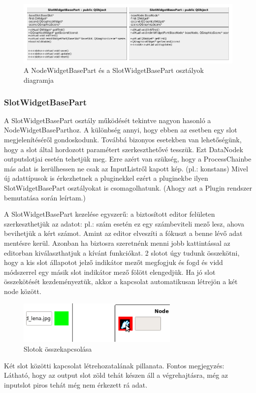 \documentclass[a4paper,12pt,oneside]{report}
\begin{document}
\begin{center}
\begin{figure}[h]
  \includegraphics[width=1.1\textwidth]{node_slot_widgetpart.png}
  \caption{A NodeWidgetBasePart és a SlotWidgetBasePart osztályok diagramja}

  \label{fig:bimg_widget_slot_view_diag}
\end{figure}
\end{center}

\subsubsection{SlotWidgetBasePart}
A SlotWidgetBasePart osztály működését tekintve nagyon hasonló a NodeWidgetBaseParthoz. A különbség annyi, hogy ebben az esetben egy slot megjelenítéséről gondoskodunk. Továbbá bizonyos esetekben van lehetőségünk, hogy a slot által hordozott paramétert szerkeszthetővé tesszük. Ezt DataNodek outputslotjai esetén tehetjük meg. Erre azért van szükség, hogy a ProcessChainbe más adat is kerülhessen ne csak az InputListről kapott kép. (pl.: konstans) Mivel új adattípusok is érkezhetnek a pluginekkel ezért a pluginekbe ilyen SlotWidgetBasePart osztályokat is csomagolhatunk. (Ahogy azt a Plugin rendszer bemutatása során leírtam.)

A SlotWidgetBasePart kezelése egyszerű: a biztosított editor felületen szerkeszthetjük az adatot: pl.: szám esetén ez egy számbeviteli mező lesz, ahova bevihetjük a kért számot. Amint az editor elveszíti a fókuszt a benne lévő adat mentésre kerül. Azonban ha biztosra szeretnénk menni jobb kattintással az editorban kiválaszthatjuk a kívánt funkciókat.
2 slotot úgy tudunk összekötni, hogy a kis slot állapotot jelző indikátor mezőt megfogjuk és fogd és vidd módszerrel egy másik slot indikátor mező fölött elengedjük. Ha jó slot összekötését kezdeményeztük, akkor a kapcsolat automatikusan létrejön a két node között.

\begin{center}
\begin{figure}[h]
  \includegraphics[width=0.7\textwidth]{connection.png}
  \caption{Slotok összekapcsolása}

  \label{fig:bimg_just connection}
\end{figure}
\end{center}
Két slot közötti kapcsolat létrehozatalának pillanata. Fontos megjegyzés: Látható, hogy az output slot zöld tehát készen áll a végrehajtásra, még az inputslot piros tehát még nem érkezett rá adat.
\end{document}
